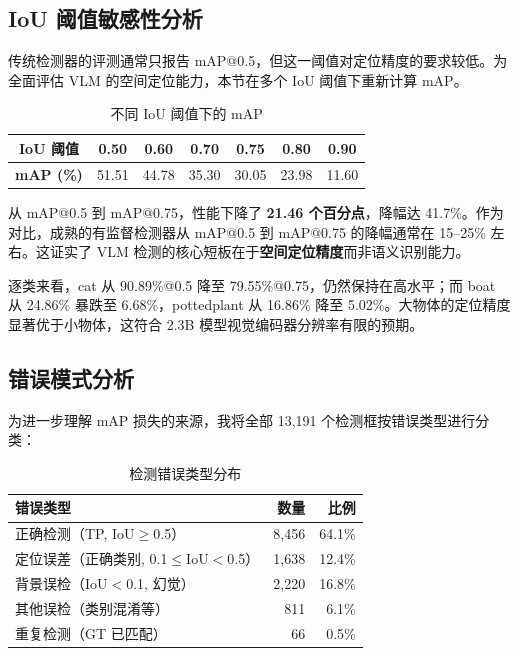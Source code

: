 \documentclass[12pt, a4paper]{article}
\begin{document}
\subsection{IoU 阈值敏感性分析}

传统检测器的评测通常只报告 mAP@0.5，但这一阈值对定位精度的要求较低。为全面评估 VLM 的空间定位能力，本节在多个 IoU 阈值下重新计算 mAP。

\begin{table}[H]
\centering
\caption{不同 IoU 阈值下的 mAP}
\label{tab:iou_sensitivity}
\begin{tabular}{@{}ccccccc@{}}
\toprule
\textbf{IoU 阈值} & 0.50 & 0.60 & 0.70 & 0.75 & 0.80 & 0.90 \\
\midrule
\textbf{mAP (\%)} & 51.51 & 44.78 & 35.30 & 30.05 & 23.98 & 11.60 \\
\bottomrule
\end{tabular}
\end{table}

从 mAP@0.5 到 mAP@0.75，性能下降了 \textbf{21.46 个百分点}，降幅达 41.7\%。作为对比，成熟的有监督检测器从 mAP@0.5 到 mAP@0.75 的降幅通常在 15--25\% 左右。这证实了 VLM 检测的核心短板在于\textbf{空间定位精度}而非语义识别能力。

逐类来看，cat 从 90.89\%@0.5 降至 79.55\%@0.75，仍然保持在高水平；而 boat 从 24.86\% 暴跌至 6.68\%，pottedplant 从 16.86\% 降至 5.02\%。大物体的定位精度显著优于小物体，这符合 2.3B 模型视觉编码器分辨率有限的预期。

\subsection{错误模式分析}

为进一步理解 mAP 损失的来源，我将全部 13,191 个检测框按错误类型进行分类：

\begin{table}[H]
\centering
\caption{检测错误类型分布}
\label{tab:error_modes}
\begin{tabular}{@{}lrr@{}}
\toprule
\textbf{错误类型} & \textbf{数量} & \textbf{比例} \\
\midrule
正确检测（TP, IoU$\geq$0.5） & 8,456 & 64.1\% \\
定位误差（正确类别, 0.1$\leq$IoU$<$0.5） & 1,638 & 12.4\% \\
背景误检（IoU$<$0.1, 幻觉） & 2,220 & 16.8\% \\
其他误检（类别混淆等） & 811 & 6.1\% \\
重复检测（GT 已匹配） & 66 & 0.5\% \\
\bottomrule
\end{tabular}
\end{table}
\end{document}
